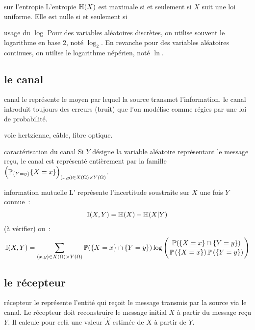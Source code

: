 \begin{proposition}{}{sur l'entropie}
    L'entropie $\mathbb{H}(X)$ est maximale si et seulement si $X$ suit une loi uniforme.
    Elle est nulle si et seulement si
\end{proposition}

\begin{remarque}{}{usage du $\log$}
    Pour des variables aléatoires discrètes, on utilise souvent le logarithme en base 2, noté $\log_2$. En revanche pour des variables aléatoires continues, on utilise le logarithme népérien, noté $\ln$.
\end{remarque}

\subsection{le canal}

\begin{definition}{}{canal}
    le  représente le moyen par lequel la source transmet l'information. le canal introduit toujours des erreurs (bruit) que l'on modélise comme régies par une loi de probabilité.
\end{definition}

\begin{exemple}{}{}
    voie hertzienne, câble, fibre optique.
\end{exemple}

\begin{proposition}{}{caractérisation du canal}
    Si $Y$ désigne la variable aléatoire représentant le message reçu, le canal est représenté entièrement par la famille $\Big(\mathbb{P}_{\{Y=y\}}\{X=x\}\Big)_{(x,y) \in X(\Omega)\times Y(\Omega)}$.
\end{proposition}

\begin{definition}{}{information mutuelle}
    L' représente l'incertitude soustraite sur $X$ une fois $Y$ connue~:
    $$\mathbb{I}(X,Y) = \mathbb{H}(X) - \mathbb{H}(X|Y)$$(à vérifier)
    ou~:
    $$\mathbb{I}(X,Y) = \sum_{(x,y) \in X(\Omega)\times Y(\Omega)} \mathbb{P}(\{X=x\}\cap\{Y=y\}) \log\Bigg(\frac{\mathbb{P}(\{X=x\}\cap\{Y=y\})}{\mathbb{P}\left(\left\{X=x\right\}\right)\mathbb{P}\left(\left\{Y=y\right\}\right)}\Bigg)$$
\end{definition}

\subsection{le récepteur}
\begin{definition}{}{récepteur}
    le  représente l'entité qui reçoit le message transmis par la source via le canal. Le récepteur doit reconstruire le message initial $X$ à partir du message reçu $Y$. Il calcule pour celà une valeur $\hat{X}$ estimée de $X$ à partir de $Y$.
\end{definition}

